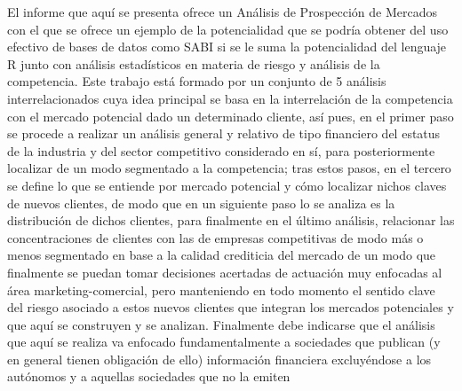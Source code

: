     El informe que aquí se presenta ofrece un Análisis de Prospección de Mercados con el que se ofrece un ejemplo de la potencialidad que se podría obtener del uso efectivo de bases de datos como SABI si se le suma la potencialidad del lenguaje R junto con análisis estadísticos en materia de riesgo y análisis de la competencia.
    Este trabajo está formado por un conjunto de 5 análisis interrelacionados cuya idea principal se basa en la interrelación de la competencia con el mercado potencial dado un determinado cliente, así pues, en el primer paso se procede a realizar un análisis general y relativo de tipo financiero del estatus de la industria y del sector competitivo considerado en sí, para posteriormente localizar de un modo segmentado a la competencia; tras estos pasos, en el tercero se define lo que se entiende por mercado potencial y cómo localizar nichos claves de nuevos clientes, de modo que en un siguiente paso lo se analiza es la distribución de dichos clientes, para finalmente en el último análisis, relacionar las concentraciones de clientes con las de empresas competitivas de modo más o menos segmentado en base a la calidad crediticia del mercado de un modo que finalmente se puedan tomar decisiones acertadas de actuación muy enfocadas al área marketing-comercial, pero manteniendo en todo momento el sentido clave del riesgo asociado a estos nuevos clientes que integran los mercados potenciales y que aquí se construyen y se analizan.
    Finalmente debe indicarse que el análisis que aquí se realiza va enfocado fundamentalmente a sociedades que publican (y en general tienen obligación de ello) información financiera excluyéndose a los autónomos y a aquellas sociedades que no la emiten

%

%
